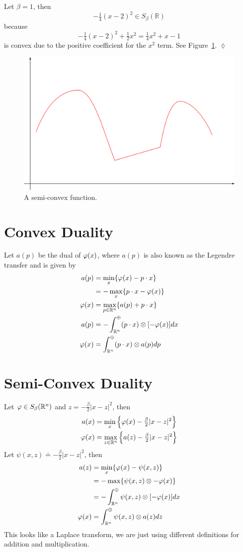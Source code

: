 \begin{example}
Let $\beta=1$, then
$$-\tfrac{1}{4}{(x-2)}^2\in S_\beta(\mathbb{R})$$
because
$$-\tfrac{1}{4}{(x-2)}^2 + \tfrac{1}{2}x^2 = \tfrac{1}{4}x^2 + x - 1$$
is convex due to the positive coefficient for the $x^2$ term.
See Figure~\ref{fig:18semiconvex}.
$\lozenge$
\end{example}

\begin{figure}[ht!]
\centering
\includegraphics[width=.4\textwidth]{images/18semiconvex}
\caption{A semi-convex function.}
\label{fig:18semiconvex}
\end{figure}

\section{Convex Duality}
Let $a(p)$ be the dual of $\varphi(x)$, where $a(p)$ is also known as the Legendre transfer and is given by
\begin{align*}
a(p) &= \min_x\{\varphi(x)-p\cdot x\} \\
&= -\max_x\{p\cdot x-\varphi(x)\} \\
\varphi(x) &= \max_{p\in\mathbb{R}^n}\{a(p)+p\cdot x\} \\
a(p) &= -\int_{\mathbb{R}^n}^\oplus (p\cdot x)\otimes[-\varphi(x)]dx \\
\varphi(x) &= \int_{\mathbb{R}^n}^\oplus (p\cdot x)\otimes a(p)dp
\end{align*}

\section{Semi-Convex Duality}
Let $\varphi\in S_\beta(\mathbb{R}^n)$ and $z=-\frac{\beta}{2}|x-z|^2$, then
\begin{align*}
a(x) &= \min_x\left\lbrace \varphi(x) - \tfrac{\beta}{2}|x-z|^2 \right\rbrace \\
\varphi(x) &= \max_{z\in\mathbb{R}^n}\left\lbrace a(z) - \tfrac{\beta}{2}|x-z|^2 \right\rbrace
\end{align*}
Let $\psi(x,z)\doteq -\tfrac{\beta}{2}|x-z|^2$, then
\begin{align*}
a(z) &= \min_x\{\varphi(x)-\psi(x,z)\} \\
&= -\max\{\psi(x,z)\otimes-\varphi(x)\} \\
&= -\int_{\mathbb{R}^n}^\oplus \psi(x,z)\otimes[-\varphi(x)]dx \\
\varphi(x) &= \int_{\mathbb{R}^n}^\oplus \psi(x,z)\otimes a(z)dz
\end{align*}
This looks like a Laplace transform, we are just using different definitions for addition and multiplication.

